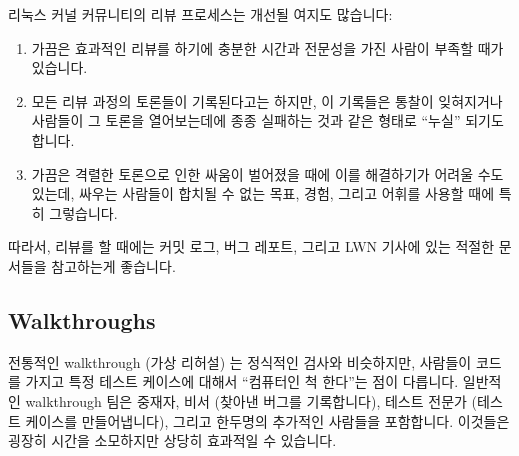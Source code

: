 리눅스 커널 커뮤니티의 리뷰 프로세스는 개선될 여지도 많습니다:

\begin{enumerate}
\item	가끔은 효과적인 리뷰를 하기에 충분한 시간과 전문성을 가진 사람이 부족할
	때가 있습니다.
\item	모든 리뷰 과정의 토론들이 기록된다고는 하지만, 이 기록들은 통찰이
	잊혀지거나 사람들이 그 토론을 열어보는데에 종종 실패하는 것과 같은
	형태로 ``누실'' 되기도 합니다.
\item	가끔은 격렬한 토론으로 인한 싸움이 벌어졌을 때에 이를 해결하기가 어려울
	수도 있는데, 싸우는 사람들이 합치될 수 없는 목표, 경험, 그리고 어휘를
	사용할 때에 특히 그렇습니다.

\end{enumerate}

따라서, 리뷰를 할 때에는 커밋 로그, 버그 레포트, 그리고 LWN 기사에 있는 적절한
문서들을 참고하는게 좋습니다.

\subsection{Walkthroughs}
\label{sec:debugging:Walkthroughs}

전통적인 walkthrough (가상 리허설) 는 정식적인 검사와 비슷하지만, 사람들이
코드를 가지고 특정 테스트 케이스에 대해서 ``컴퓨터인 척 한다''는 점이 다릅니다.
일반적인 walkthrough 팀은 중재자, 비서 (찾아낸 버그를 기록합니다), 테스트
전문가 (테스트 케이스를 만들어냅니다), 그리고 한두명의 추가적인 사람들을
포함합니다.
이것들은 굉장히 시간을 소모하지만 상당히 효과적일 수 있습니다.
\iffalse

